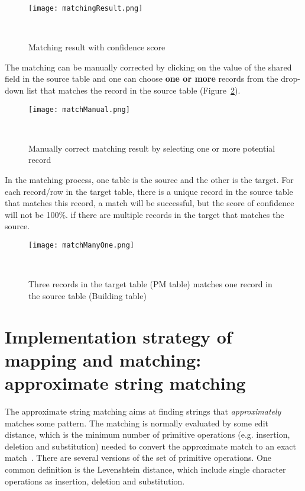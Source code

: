 \documentclass[12pt]{article}
\newcommand{\fref}[1]{Figure~\ref{#1}}
\begin{document}
\begin{figure}[h!]
  \centering
  \texttt{[image: matchingResult.png]}
  \caption{Matching result with confidence
    score}~\cite{SEEDWebpage2015}
  \label{fig:matchingResult}
\end{figure}

The matching can be manually corrected by clicking on the value of the
shared field in the source table and one can choose \textbf{one or
  more} records from the drop-down list that matches the record in the
source table (\fref{fig:matchManual}).

\begin{figure}[h!]
  \centering
  \texttt{[image: matchManual.png]}
  \caption{Manually correct matching result by selecting one or more
    potential record}~\cite{SEEDWebpage2015}
  \label{fig:matchManual}
\end{figure}

In the matching process, one table is the source and the other is the
target. For each record/row in the target table, there is a unique
record in the source table that matches this record, a match will be
successful, but the score of confidence will not be 100\%. if there
are multiple records in the target that matches the source.

\begin{figure}[h!]
  \centering
  \texttt{[image: matchManyOne.png]}
  \caption{Three records in the target table (PM table) matches one
    record in the source table (Building table)}~\cite{SEEDWebpage2015}
  \label{fig:matchManyOne}
\end{figure}

\section{Implementation strategy of mapping and matching: approximate
  string matching}
The approximate string matching aims at finding strings that
\emph{approximately} matches some pattern. The matching is normally
evaluated by some edit distance, which is the minimum number of
primitive operations (e.g. insertion, deletion and substitution)
needed to convert the approximate match to an exact
match~\cite{approxStringMatchWiki}. There are several versions of the
set of primitive operations. One common definition is the Levenshtein
distance, which include single character operations as insertion,
deletion and substitution.
\end{document}
